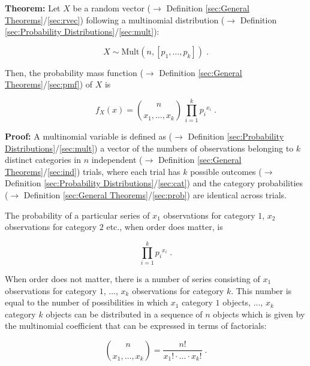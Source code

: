 \documentclass[a4paper,12pt,twoside]{book}
\begin{document}
\textbf{Theorem:} Let $X$ be a random vector ($\rightarrow$ Definition \ref{sec:General Theorems}/\ref{sec:rvec}) following a multinomial distribution ($\rightarrow$ Definition \ref{sec:Probability Distributions}/\ref{sec:mult}):

\begin{equation} \label{eq:mult-pmf-mult}
X \sim \mathrm{Mult}(n, \left[p_1, \ldots, p_k \right]) \; .
\end{equation}

Then, the probability mass function ($\rightarrow$ Definition \ref{sec:General Theorems}/\ref{sec:pmf}) of $X$ is

\begin{equation} \label{eq:mult-pmf-mult-pmf}
f_X(x) = {n \choose {x_1, \ldots, x_k}} \, \prod_{i=1}^k {p_i}^{x_i} \; .
\end{equation}


\vspace{1em}
\textbf{Proof:} A multinomial variable is defined as ($\rightarrow$ Definition \ref{sec:Probability Distributions}/\ref{sec:mult}) a vector of the numbers of observations belonging to $k$ distinct categories in $n$ independent ($\rightarrow$ Definition \ref{sec:General Theorems}/\ref{sec:ind}) trials, where each trial has $k$ possible outcomes ($\rightarrow$ Definition \ref{sec:Probability Distributions}/\ref{sec:cat}) and the category probabilities ($\rightarrow$ Definition \ref{sec:General Theorems}/\ref{sec:prob}) are identical across trials.

The probability of a particular series of $x_1$ observations for category $1$, $x_2$ observations for category $2$ etc., when order does matter, is

\begin{equation} \label{eq:mult-pmf-mult-prob}
\prod_{i=1}^k {p_i}^{x_i} \; .
\end{equation}

When order does not matter, there is a number of series consisting of $x_1$ observations for category $1$, ..., $x_k$ observations for category $k$. This number is equal to the number of possibilities in which $x_1$ category $1$ objects, ..., $x_k$ category $k$ objects can be distributed in a sequence of $n$ objects which is given by the multinomial coefficient that can be expressed in terms of factorials:

\begin{equation} \label{eq:mult-pmf-mult-coeff}
{n \choose {x_1, \ldots, x_k}} = \frac{n!}{x_1! \cdot \ldots \cdot x_k!} \; .
\end{equation}
\end{document}

